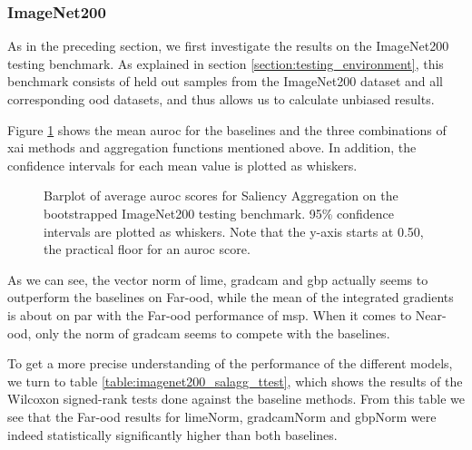 \documentclass[UKenglish]{uiomasterthesis} %
\theoremstyle{definition}
\begin{document}
\subsubsection{ImageNet200}

As in the preceding section, we first investigate the results on the ImageNet200 testing benchmark. As explained in section \ref{section:testing_environment}, this benchmark consists of held out samples from the ImageNet200 dataset and all corresponding \ac{ood} datasets, and thus allows us to calculate unbiased results. 

Figure \ref{fig:imagenet200_salagg_bootstrap_barplot} shows the mean \ac{auroc} for the baselines and the three combinations of \ac{xai} methods and aggregation functions mentioned above. In addition, the confidence intervals for each mean value is plotted as whiskers.

\begin{figure}[H]
    \begin{center}
        
    \end{center}
    \caption[ImageNet200 Saliency Aggregation Bootstrap]{Barplot of average \ac{auroc} scores for Saliency Aggregation on the bootstrapped ImageNet200 testing benchmark. 95\% confidence intervals are plotted as whiskers. Note that the y-axis starts at 0.50, the practical floor for an \ac{auroc} score.}
    \label{fig:imagenet200_salagg_bootstrap_barplot}
\end{figure}

As we can see, the vector norm of \ac{lime}, \ac{gradcam} and \ac{gbp} actually seems to outperform the baselines on Far-\ac{ood}, while the mean of the integrated gradients is about on par with the Far-\ac{ood} performance of \ac{msp}. When it comes to Near-\ac{ood}, only the norm of \ac{gradcam} seems to compete with the baselines.

To get a more precise understanding of the performance of the different models, we turn to table \ref{table:imagenet200_salagg_ttest}, which shows the results of the Wilcoxon signed-rank tests done against the baseline methods. From this table we see that the Far-\ac{ood} results for \ac{lime}Norm, \ac{gradcam}Norm and \ac{gbp}Norm were indeed statistically significantly higher than both baselines.
\end{document}
